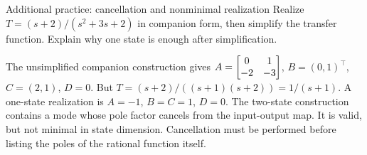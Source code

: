 \begin{question}{Additional practice: cancellation and nonminimal realization}
Realize $T=(s+2)/(s^2+3s+2)$ in companion form, then simplify the transfer function. Explain why one state is enough after simplification.
\end{question}
\begin{answer}
The unsimplified companion construction gives $A=\begin{bmatrix}0&1\\-2&-3\end{bmatrix}$, $B=(0,1)^{\top}$, $C=(2,1)$, $D=0$. But $T=(s+2)/((s+1)(s+2))=1/(s+1)$. A one-state realization is $A=-1$, $B=C=1$, $D=0$. The two-state construction contains a mode whose pole factor cancels from the input-output map. It is valid, but not minimal in state dimension. Cancellation must be performed before listing the poles of the rational function itself.
\end{answer}

